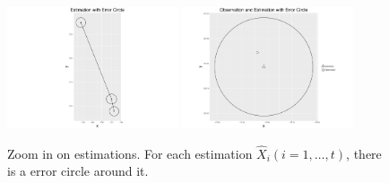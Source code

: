 \begin{figure}[h]
\centering
\includegraphics[width=0.45\textwidth]{Chapters/05MCMCOU/plots/realdataEstXYwithEr.pdf}
\includegraphics[width=0.45\textwidth]{Chapters/05MCMCOU/plots/realdataestwitherror.pdf}
\caption{Zoom in on estimations. For each estimation $\hat{X}_i (i=1,\dots,t)$, there is a error circle around it. }
\end{figure}










\clearpage




